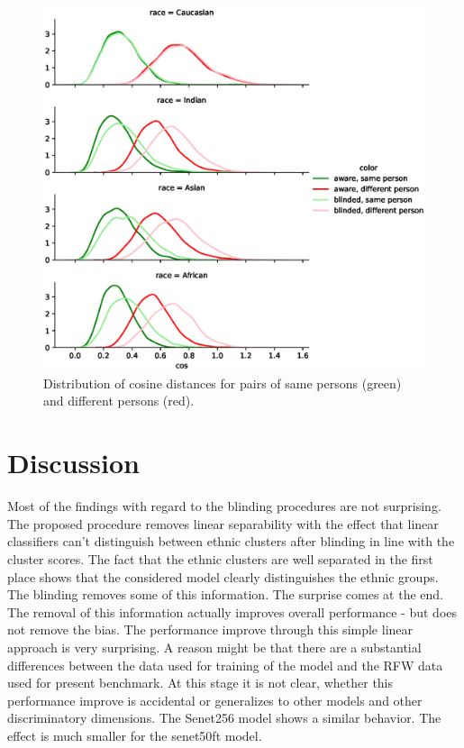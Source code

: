 \documentclass[12pt]{article}
\begin{document}
\begin{figure}
  \includegraphics[width=\textwidth]{bias.eps}
  \caption{Distribution of cosine distances for pairs of same persons (green) and different persons (red).}
  \label{fig:frrate}
\end{figure}

\section{Discussion}

Most of the findings with regard to the blinding procedures are not surprising. The proposed procedure removes linear separability with the effect that linear classifiers can't distinguish between ethnic clusters after blinding in line with the cluster scores. The fact that the ethnic clusters are well separated in the first place shows that the considered model clearly distinguishes the ethnic groups. The blinding removes some of this information. The surprise comes at the end. The removal of this information actually improves overall performance - but does not remove the bias. The performance improve through this simple linear approach is very surprising. A reason might be that there are a substantial differences between the data used for training of the model and the RFW data used for present benchmark. At this stage it is not clear, whether this performance improve is accidental or generalizes to other models and other discriminatory dimensions. The Senet256 model shows a similar behavior. The effect is much smaller for the senet50ft model. 
\end{document}

